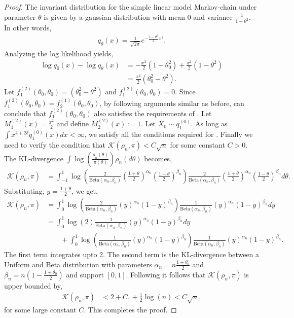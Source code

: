 \documentclass[11pt]{amsart}
\begin{document}
\begin{proof}
The invariant distribution for the simple linear model Markov-chain under parameter $\theta$ is given by a gaussian distribution with mean $0$ and variance $\frac{1}{1-\theta^2}$. In other words,
%
\begin{align*}
    q_{\theta}(x)= \frac{1}{\sqrt{2\pi}}e^{-\frac{1-\theta^2}{2}x^2}.
\end{align*}
%
Analyzing the log likelihood yields,
%
\begin{align*}
    \log q_{0}(x)-\log q_{\theta}(x) & =-\frac{x^2}{2}(1-\theta_0^2)+\frac{x^2}{2}(1-\theta^2)\\
    & = \frac{x^2}{2}(\theta_0^2-\theta^2).
\end{align*}
%
Let $f^{(2)}_1(\theta_0,\theta_0)=(\theta_0^2-\theta^2)$ and $f^{(2)}_1(\theta_0,\theta_0)=0$. Since $f^{(2)}_1(\theta_0,\theta_0)=f^{(1)}_2(\theta_0,\theta_0)$, by following arguments similar as before, can conclude that $f^{(2)}_1(\theta_0,\theta_0)$ also satisfies the requirements of . Let $M^{(2)}_1(x)=\frac{x^2}{2}$ and define $M^{(2)}_2(x):=1$. Let $X_0\sim q_1^{(0)}$. As long as $\int x^{4+2\delta} q_1^{(0)}(x) dx<\infty$, we satisfy all the conditions required for .
Finally we need to verify the condition that $\mathcal{K}(\rho_n,\pi)<C\sqrt{n}$ for some constant $C>0$. 
The KL-divergence $\int \log \left(\frac{\rho_n(\theta)}{\pi(\theta)}\right)\rho_n(d\theta)$ becomes,
\begin{align*}
     \mathcal{K}(\rho_n,\pi) & = \int_{-1}^1 \log\left(\frac{2}{\text{Beta}(\alpha_n,\beta_n)}\left(\frac{1+\theta}{2}\right)^{\alpha_n}\left(\frac{1-\theta}{2}\right)^{\beta_n}\right) \frac{2}{\text{Beta}(\alpha_n,\beta_n)}\left(\frac{1+\theta}{2}\right)^{\alpha_n}\left(\frac{1-\theta}{2}\right)^{\beta_n} d\theta.
\end{align*}
Substituting, $y=\frac{1+\theta}{2}$, we get,
\begin{align*}
    \mathcal{K}(\rho_n,\pi) & = \int_{0}^1 \log\left(\frac{2}{\text{Beta}(\alpha_n,\beta_n)}\left(y\right)^{\alpha_n}\left(1-y\right)^{\beta_n}\right) \frac{1}{\text{Beta}(\alpha_n,\beta_n)}\left(y\right)^{\alpha_n}\left(1-y\right)^{\beta_n} dy \\
    & = \int_0^1 \log(2) \frac{1}{\text{Beta}(\alpha_n,\beta_n)}\left(y\right)^{\alpha_n}\left(1-y\right)^{\beta_n} dy \\
    & \qquad +\int_{0}^1 \log\left(\frac{1}{\text{Beta}(\alpha_n,\beta_n)}\left(y\right)^{\alpha_n}\left(1-y\right)^{\beta_n}\right) \frac{1}{\text{Beta}(\alpha_n,\beta_n)}\left(y\right)^{\alpha_n}\left(1-y\right)^{\beta_n}. 
\end{align*}
{The first term integrates upto 2. The second term is the KL-divergence between a Uniform and Beta distribution with parameters $\alpha_n=n\frac{1+\theta_0}{2}$ and $\beta_n=n(1-\frac{1+\theta_0}{2})$ and support $[0,1]$. Following  it follows that $\mathcal{K}(\rho_n,\pi)$ is upper bounded by,}
\begin{align*}
    \mathcal{K}(\rho_n,\pi) & <2+C_1+\frac{1}{2}\log(n) < C\sqrt{n},
\end{align*}
for some large constant $C$. This completes the proof.
\end{proof}
\end{document}
